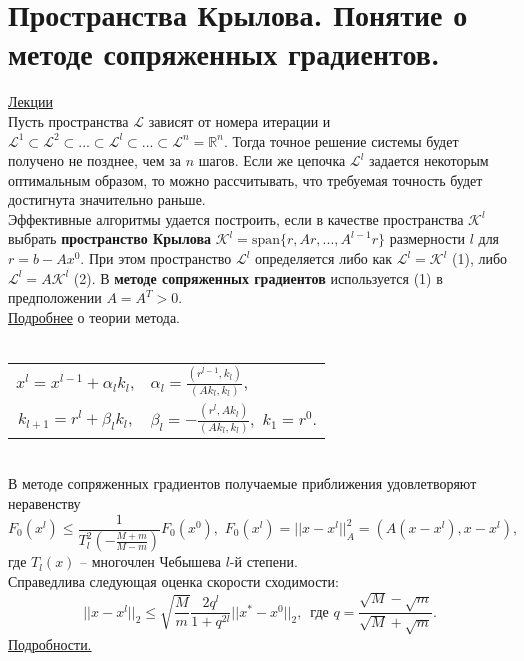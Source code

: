 \documentclass[specialist, subf, href, colorlinks=true, 12pt, times, mtpro, final]{disser}
\theoremstyle{definition}
\def\mcL{\mathcal{L}}
\def\mcK{\mathcal{K}}
\begin{document}
{\section {Пространства Крылова. Понятие о методе сопряженных градиентов.}
    \hyperlink {lects.74}{Лекции}\\
    Пусть пространства $\mcL$ зависят от номера итерации и $\mcL^1 \subset \mcL^2 \subset
    ... \subset \mcL^l \subset ... \subset \mcL^n = \mathds{R}^n$. Тогда точное решение
    системы будет получено не позднее, чем за $n$ шагов. Если же цепочка $\mcL^l$ задается
    некоторым оптимальным образом, то можно рассчитывать, что требуемая точность будет
    достигнута значительно раньше.\\
    Эффективные алгоритмы удается построить, если в качестве пространства $\mcK^l$ выбрать
    {\bf пространство Крылова} $\mcK^l = \text{span}\{r, Ar, ..., A^{l-1}r\}$ размерности
    $l$ для $r = b - Ax^0$. При этом пространство $\mcL^l$ определяется либо как
    $\mcL^l = \mcK^l$ (1), либо $\mcL^l = A\mcK^l$ (2). В {\bf методе сопряженных
    градиентов} используется (1) в предположении $A = A^T > 0$.\\
    \hyperlink {lects.75}{Подробнее} о теории метода.\\
    \\
    \begin{tabular}{cl}
        $x^l = x^{l-1} + \alpha_l k_l$, & $\alpha_l = \frac{(r^{l-1},k_l)}{(Ak_l,k_l)}$,\\
        $k_{l+1} = r^l + \beta_l k_l$,  & $\beta_l = -\frac{(r^l,Ak_l)}{(Ak_l,k_l)},
        \,\,k_1 = r^0.$
    \end{tabular}\\
    В методе сопряженных градиентов получаемые приближения удовлетворяют неравенству
    $$
        F_0(x^l)\le\frac{1}{T_l^2\left(-\frac{M+m}{M-m}\right)}F_0(x^0),\,\,
        F_0(x^l) = ||x-x^l||_A^2 = (A(x-x^l),x-x^l),
    $$
    где $T_l(x)$ -- многочлен Чебышева $l$-й степени.\\
    Справедлива следующая оценка скорости сходимости:
    $$
        ||x-x^l||_2 \le \sqrt{\frac{M}{m}}\frac{2q^l}{1+q^{2l}}||x^*-x^0||_2,\,\,\,
        \text{где } q = \frac{\sqrt{M}-\sqrt{m}}{\sqrt{M}+\sqrt{m}}.
    $$
    \hyperlink {lects.76}{Подробности.}

}
\end{document}
